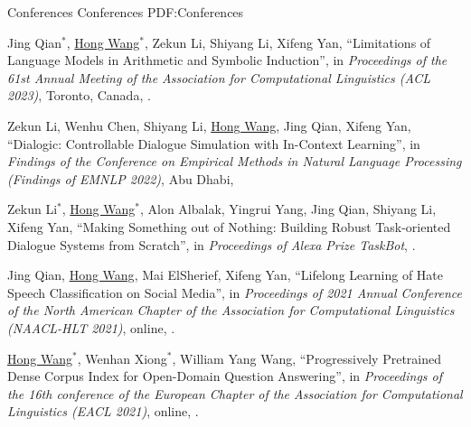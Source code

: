 \documentclass[letterpaper,MMMyyyy,nonstopmode]{simpleresumecv}
\begin{document}
\begin{Body}


\BigGap
\SubSection
{Conferences}
{Conferences}
{PDF:Conferences}

\begin{enumerate}[label={[\arabic*]~~}]
\item
Jing Qian$^*$, \underline{Hong Wang}$^*$, Zekun Li, Shiyang Li, Xifeng Yan,
``Limitations of Language Models in Arithmetic and Symbolic Induction'',
in \textit{Proceedings of the 61st Annual Meeting of the Association for Computational Linguistics (ACL 2023)}, Toronto, Canada, 
.

\item 
Zekun Li, Wenhu Chen, Shiyang Li, \underline{Hong Wang}, Jing Qian, Xifeng Yan,
``Dialogic: Controllable Dialogue Simulation with In-Context Learning'',
in \textit{Findings of the Conference on Empirical Methods in Natural Language Processing (Findings of EMNLP 2022)}, Abu Dhabi,

\item
Zekun Li$^*$, \underline{Hong Wang}$^*$, Alon Albalak, Yingrui Yang, Jing Qian, Shiyang Li, Xifeng Yan,
``Making Something out of Nothing: Building Robust Task-oriented Dialogue Systems from Scratch'',
in \textit{Proceedings of Alexa Prize TaskBot},
.

\item
Jing Qian, \underline{Hong Wang}, Mai ElSherief, Xifeng Yan, 
``Lifelong Learning of Hate Speech Classification on Social Media'',
in \textit{Proceedings of 2021 Annual Conference of the North American Chapter of the Association for Computational Linguistics (NAACL-HLT 2021)}, online, .

\item
\underline{Hong Wang}$^*$, Wenhan Xiong$^*$, William Yang Wang,
``Progressively Pretrained Dense Corpus Index for Open-Domain Question Answering'',
in \textit{Proceedings of the 16th conference of the European Chapter of the Association for Computational Linguistics (EACL 2021)}, online, 
.


\end{enumerate}
\end{Body}
\end{document}
